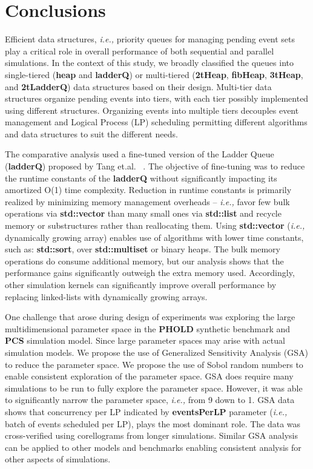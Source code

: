 \chapter{Conclusions}

Efficient data structures, \textit{i.e.,} priority queues for managing pending
event sets play a critical role in overall performance of both
sequential and parallel simulations.  In the context of this study, we
broadly classified the queues into single-tiered (\textbf{heap} and
\textbf{ladderQ}) or multi-tiered (\textbf{2tHeap}, \textbf{fibHeap}, \textbf{3tHeap}, and
\textbf{2tLadderQ}) data structures based on their design.  Multi-tier data
structures organize pending events into tiers, with each tier possibly
implemented using different structures.  Organizing events into
multiple tiers decouples event management and Logical Process (LP)
scheduling permitting different algorithms and data structures to suit
the different needs.

The comparative analysis used a fine-tuned version of the Ladder Queue
(\textbf{ladderQ}) proposed by Tang et.al. ~\cite{tang-05}.  The objective of
fine-tuning was to reduce the runtime constants of the \textbf{ladderQ}
without significantly impacting its amortized O(1) time complexity.
Reduction in runtime constants is primarily realized by minimizing
memory management overheads -- \textit{i.e.,}  favor few bulk
operations via \textbf{std::vector} than many small ones via \textbf{std::list}
and  recycle memory or substructures rather than
reallocating them.  Using \textbf{std::vector} (\textit{i.e.,} dynamically growing
array) enables use of algorithms with lower time constants, such as:
\textbf{std::sort}, over \textbf{std::multiset} or binary heaps.  The bulk
memory operations do consume additional memory, but our analysis shows
that the performance gains significantly outweigh the extra memory
used.  Accordingly, other simulation kernels can significantly improve
overall performance by replacing linked-lists with dynamically growing
arrays.

One challenge that arose during design of experiments was exploring
the large multidimensional parameter space in the \textbf{PHOLD} synthetic
benchmark and \textbf{PCS} simulation model.  Since large parameter spaces may arise with actual
simulation models.  We propose the use of Generalized Sensitivity
Analysis (GSA) to reduce the parameter space.  We propose the use of
Sobol random numbers to enable consistent exploration of the parameter
space.  GSA does require many simulations to be run to fully explore
the parameter space.  However, it was able to significantly narrow the
parameter space, \textit{i.e.,} from 9 down to 1.  GSA data shows that
concurrency per LP indicated by \textbf{eventsPerLP} parameter (\textit{i.e.,} batch
of events scheduled per LP), plays the most dominant role.  The data
was cross-verified using corellograms from longer simulations.  Similar
GSA analysis can be applied to other models and benchmarks enabling
consistent analysis for other aspects of simulations.


